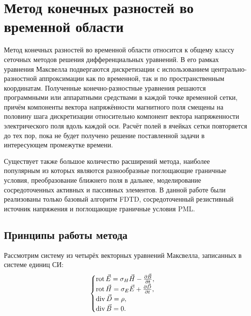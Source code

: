 \section{Метод конечных разностей во временной области}

Метод конечных разностей во временной области относится к общему классу сеточных методов решения дифференциальных уравнений. В его рамках уравнения Максвелла подвергаются дискретизации с использованием центрально-разностной аппроксимации как по временной, так и по пространственным координатам. Полученные конечно-разностные уравнения решаются программными или аппаратными средствами в каждой точке временной сетки, причём компоненты вектора напряжённости магнитного поля смещены на половину шага дискретизации относительно компонент вектора напряженности электрического поля вдоль каждой оси. Расчёт полей в ячейках сетки повторяется до тех пор, пока не будет получено решение поставленной задачи в интересующем промежутке времени.


Существует также большое количество расширений метода, наиболее популярным из которых являются разнообразные поглощающие граничные условия, преобразование ближнего поля в дальнее, моделирование сосредоточенных активных и пассивных элементов. В данной работе были реализованы только базовый алгоритм FDTD, сосредоточенный резистивный источник напряжения и поглощающие граничные условия PML.

\subsection{Принципы работы метода}

Рассмотрим систему из четырёх векторных уравнений Максвелла, записанных в системе единиц СИ:
\begin{equation}
    \label{eq:MaxwellEquations}
	\begin{cases}
		\operatorname{rot}\vec{E} = \sigma_{H}\vec{H}-\frac{\partial {\vec{B}}}{\partial {t}}, \\
		\operatorname{rot}\vec{H} = \sigma_{E}\vec{E}+\frac{\partial {\vec{D}}}{\partial {t}}, \\
		\operatorname{div}\vec{D} = \rho, \\
		\operatorname{div}\vec{B} = 0.
	\end{cases}
\end{equation}

